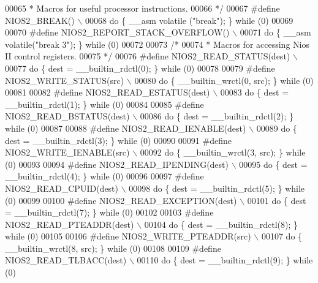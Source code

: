 \begin{DoxyCode}
{{{00065 \textcolor{comment}{ * Macros for useful processor instructions.}
00066 \textcolor{comment}{ */}
00067 \textcolor{preprocessor}{#define NIOS2\_BREAK() \(\backslash\)}
00068 \textcolor{preprocessor}{    do \{ \_\_asm volatile ("break"); \} while (0)}
00069 
00070 \textcolor{preprocessor}{#define NIOS2\_REPORT\_STACK\_OVERFLOW() \(\backslash\)}
00071 \textcolor{preprocessor}{    do \{ \_\_asm volatile("break 3"); \} while (0)}
00072 
00073 \textcolor{comment}{/*}
00074 \textcolor{comment}{ * Macros for accessing Nios II control registers.}
00075 \textcolor{comment}{ */}
00076 \textcolor{preprocessor}{#define NIOS2\_READ\_STATUS(dest) \(\backslash\)}
00077 \textcolor{preprocessor}{    do \{ dest = \_\_builtin\_rdctl(0); \} while (0)}
00078 
00079 \textcolor{preprocessor}{#define NIOS2\_WRITE\_STATUS(src) \(\backslash\)}
00080 \textcolor{preprocessor}{    do \{ \_\_builtin\_wrctl(0, src); \} while (0)}
00081 
00082 \textcolor{preprocessor}{#define NIOS2\_READ\_ESTATUS(dest) \(\backslash\)}
00083 \textcolor{preprocessor}{    do \{ dest = \_\_builtin\_rdctl(1); \} while (0)}
00084 
00085 \textcolor{preprocessor}{#define NIOS2\_READ\_BSTATUS(dest) \(\backslash\)}
00086 \textcolor{preprocessor}{    do \{ dest = \_\_builtin\_rdctl(2); \} while (0)}
00087 
00088 \textcolor{preprocessor}{#define NIOS2\_READ\_IENABLE(dest) \(\backslash\)}
00089 \textcolor{preprocessor}{    do \{ dest = \_\_builtin\_rdctl(3); \} while (0)}
00090 
00091 \textcolor{preprocessor}{#define NIOS2\_WRITE\_IENABLE(src) \(\backslash\)}
00092 \textcolor{preprocessor}{    do \{ \_\_builtin\_wrctl(3, src); \} while (0)}
00093 
00094 \textcolor{preprocessor}{#define NIOS2\_READ\_IPENDING(dest) \(\backslash\)}
00095 \textcolor{preprocessor}{    do \{ dest = \_\_builtin\_rdctl(4); \} while (0)}
00096 
00097 \textcolor{preprocessor}{#define NIOS2\_READ\_CPUID(dest) \(\backslash\)}
00098 \textcolor{preprocessor}{    do \{ dest = \_\_builtin\_rdctl(5); \} while (0)}
00099 
00100 \textcolor{preprocessor}{#define NIOS2\_READ\_EXCEPTION(dest) \(\backslash\)}
00101 \textcolor{preprocessor}{    do \{ dest = \_\_builtin\_rdctl(7); \} while (0)}
00102 
00103 \textcolor{preprocessor}{#define NIOS2\_READ\_PTEADDR(dest) \(\backslash\)}
00104 \textcolor{preprocessor}{    do \{ dest = \_\_builtin\_rdctl(8); \} while (0)}
00105 
00106 \textcolor{preprocessor}{#define NIOS2\_WRITE\_PTEADDR(src) \(\backslash\)}
00107 \textcolor{preprocessor}{    do \{ \_\_builtin\_wrctl(8, src); \} while (0)}
00108 
00109 \textcolor{preprocessor}{#define NIOS2\_READ\_TLBACC(dest) \(\backslash\)}
00110 \textcolor{preprocessor}{    do \{ dest = \_\_builtin\_rdctl(9); \} while (0)}
}}}
\end{DoxyCode}
